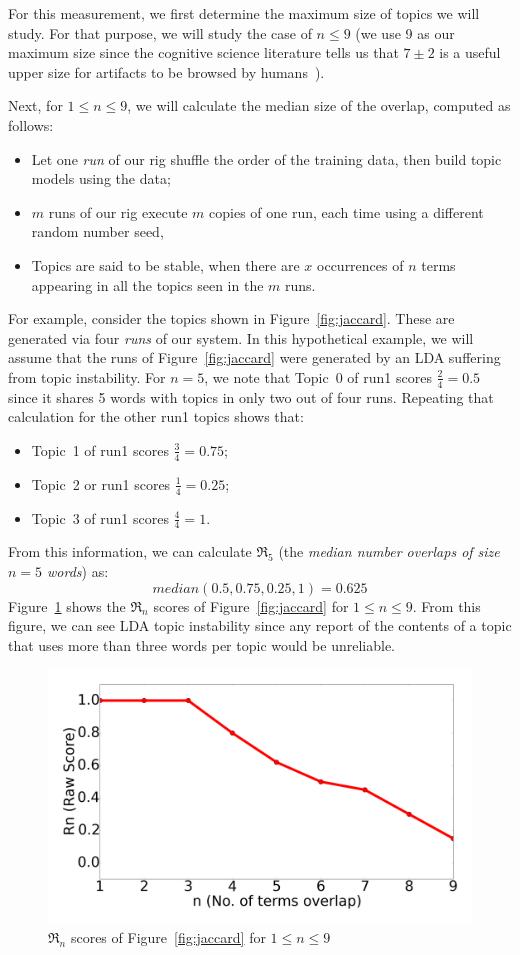 \documentclass[twocolumn,5p,sort&compress]{elsarticle}
\newcommand{\bi}{\begin{itemize}}
\newcommand{\ei}{\end{itemize}}
\theoremstyle{break}
\begin{document}
For this measurement, we first determine the maximum size of topics we will study. For that purpose,
we will study the case of $n \le 9$ (we use 9 as our maximum size since the cognitive
science literature tells us that $7\pm 2$ is a useful upper size for artifacts to be browsed by humans~\cite{miller1956magical}).


Next, for $1 \le n \le 9$, we will calculate the median size of the overlap,
computed as follows:
\bi
\item Let one {\em run} of our rig shuffle the order of the training data, then build topic models using the data;
  \item $m$ runs of our rig execute $m$ copies of one run, each time using a different random number seed,
\item Topics are said to be stable,
when there are $x$ occurrences of  $n$ terms appearing in all the topics seen in the $m$ runs.
\ei


For example, consider the topics shown in Figure~\ref{fig:jaccard}. These are generated via four {\em runs} of our system. In this hypothetical example, we will assume that the runs of
 Figure~\ref{fig:jaccard} were generated by an LDA suffering from topic instability.
For $n=5$, we note that Topic~0 of run1 scores $\frac{2}{4}=0.5$ since it shares 5 words with topics in only two out of four runs.
Repeating that calculation for the other run1 topics shows that:
\bi
\item Topic~1 of run1 scores $\frac{3}{4}=0.75$;
\item Topic~2 or run1 scores $\frac{1}{4}=0.25$;
\item Topic~3 of run1 scores $\frac{4}{4}=1$.
  \ei
  From this information, we can calculate
  $\Re_5$  (the
  {\em median number overlaps of size $n=5$ words}) as:
  \[
   \mathit{median}(0.5, 0.75, 0.25, 1) =0.625\]
  Figure~\ref{fig:alln}
  shows the $\Re_n$ scores of 
  Figure~\ref{fig:jaccard} for $1 \le n \le 9$.  From this figure, we can see LDA topic instability
  since
  any report of the contents of a topic that uses more than three words per topic would be unreliable.

  \begin{figure}[!h]
  \includegraphics[width=\linewidth]{./fig/alln.png}
  \caption{$\Re_n$ scores of 
  Figure~\ref{fig:jaccard} for $1 \le n \le 9$}
  \label{fig:alln}
\end{figure}
\end{document}
